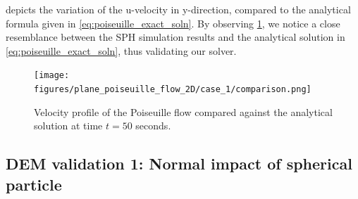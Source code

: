 \documentclass[preprint,12pt]{elsarticle}
\providecommand{\DIFaddbeginFL}{} %
\providecommand{\DIFaddendFL}{} %
\providecommand{\DIFdelbeginFL}{} %
\providecommand{\DIFdelendFL}{} %
\newcommand{\DIFscaledelfig}{0.5}
\newlength{\DIFdelgraphicswidth} %
\newlength{\DIFdelgraphicsheight} %
\newcommand{\DIFaddincludegraphics}[2][]{{\color{blue}\fbox{\DIFOincludegraphics[#1]{#2}}}} %
\newcommand{\DIFdelincludegraphics}[2][]{%
\sbox{\DIFdelgraphicsbox}{\DIFOincludegraphics[#1]{#2}}%
\settoboxwidth{\DIFdelgraphicswidth}{\DIFdelgraphicsbox} %
\settoboxtotalheight{\DIFdelgraphicsheight}{\DIFdelgraphicsbox} %
\scalebox{\DIFscaledelfig}{%
\parbox[b]{\DIFdelgraphicswidth}{\usebox{\DIFdelgraphicsbox}\\[-\baselineskip] \rule{\DIFdelgraphicswidth}{0em}}\llap{\resizebox{\DIFdelgraphicswidth}{\DIFdelgraphicsheight}{%
\setlength{\unitlength}{\DIFdelgraphicswidth}%
\begin{picture}(1,1)%
\thicklines\linethickness{2pt} %
{\color[rgb]{1,0,0}\put(0,0){\framebox(1,1){}}}%
{\color[rgb]{1,0,0}\put(0,0){\line( 1,1){1}}}%
{\color[rgb]{1,0,0}\put(0,1){\line(1,-1){1}}}%
\end{picture}%
}\hspace*{3pt}}} %
} %
\DeclareRobustCommand{\DIFaddbeginFL}{\DIFOaddbeginFL \let\includegraphics\DIFaddincludegraphics} %
\DeclareRobustCommand{\DIFaddendFL}{\DIFOaddendFL \let\includegraphics\DIFOincludegraphics} %
\DeclareRobustCommand{\DIFdelbeginFL}{\DIFOdelbeginFL \let\includegraphics\DIFdelincludegraphics} %
\DeclareRobustCommand{\DIFdelendFL}{\DIFOaddendFL \let\includegraphics\DIFOincludegraphics} %
\begin{document}
 depicts the variation of the u-velocity in
y-direction, compared to the analytical formula given in
\cref{eq:poiseuille_exact_soln}.  By observing
\cref{fig:poiseuille_soln_graph}, we notice a close resemblance between the
SPH simulation results and the analytical solution in
\cref{eq:poiseuille_exact_soln}, thus validating our solver.
\begin{figure}[!htpb]
  \centering
  \DIFdelbeginFL %
\DIFdelendFL \DIFaddbeginFL \texttt{[image: figures/plane\_poiseuille\_flow\_2D/case\_1/comparison.png]}
  \DIFaddendFL \caption{Velocity profile of the Poiseuille flow compared against the
    analytical solution at time $t=50$ seconds.}
  \label{fig:poiseuille_soln_graph}
\end{figure}






\FloatBarrier%
\subsection{DEM validation 1: Normal impact of spherical particle}
\label{sec:DEM_validation_1_normal_impact}
\end{document}

